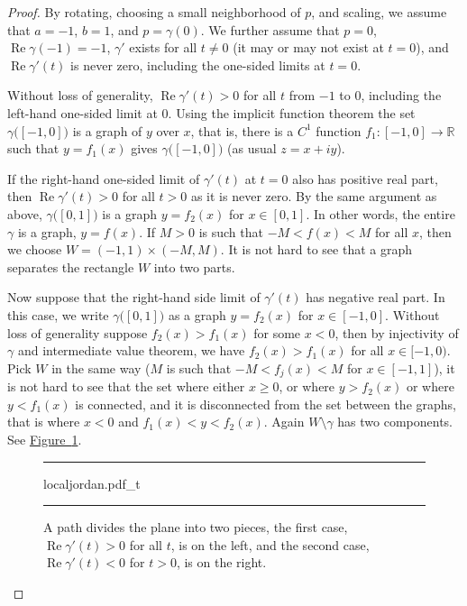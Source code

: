 \documentclass[12pt,openany]{book}
\renewcommand{\Re}{\operatorname{Re}}
\newcommand{\R}{{\mathbb{R}}}
\theoremstyle{plain}
\theoremstyle{remark}
\theoremstyle{definition}
\newenvironment{myfig}{%
\begin{figure}[h!t]
\noindent\rule{\textwidth}{0.5pt}\vspace{12pt}\par\centering}%
{\par\noindent\rule{\textwidth}{0.5pt}
\end{figure}}
\theoremstyle{exercise}
\theoremstyle{example}
\newcommand{\figureref}[1]{\hyperref[#1]{Figure~\ref*{#1}}}
\begin{document}
\begin{proof}
By rotating, choosing a small neighborhood of $p$, and scaling,
we assume that $a=-1$, $b=1$, and $p = \gamma(0)$.
We further assume that
$p=0$, $\Re \gamma(-1) = -1$,
$\gamma'$ exists for all $t \not=0$ (it may or may not exist at $t=0$),
and $\Re \gamma'(t)$ is
never zero, including the one-sided limits at $t=0$.

Without loss of generality, $\Re \gamma'(t) > 0$ for all $t$ from $-1$ to $0$,
including the left-hand one-sided limit at $0$.  Using the implicit function
theorem the set $\gamma\bigl([-1,0]\bigr)$ is a graph of $y$ over $x$, that
is, there is a $C^1$ function $f_1 \colon [-1,0] \to \R$ such that
$y=f_1(x)$ gives $\gamma\bigl([-1,0]\bigr)$ (as usual $z=x+iy$).

If the right-hand one-sided limit of $\gamma'(t)$ at $t=0$ also has positive real
part, then $\Re \gamma'(t) > 0$ for all $t > 0$ as it is never zero.
By the same argument as
above, $\gamma\bigl([0,1]\bigr)$ is a graph $y=f_2(x)$ for $x \in [0,1]$.
In other words, the entire $\gamma$ is a graph, $y=f(x)$.  If $M > 0$ is such that
$-M<f(x)<M$ for all $x$, then
we choose $W=(-1,1) \times (-M,M)$.  It is not hard to see that a
graph separates the rectangle $W$ into two parts.

Now suppose that the right-hand side limit of $\gamma'(t)$ has negative real
part.  In this case, we write $\gamma\bigl([0,1]\bigr)$ as a graph $y=f_2(x)$
for $x \in [-1,0]$.  Without loss of generality suppose $f_2(x) > f_1(x)$
for some $x < 0$, then by injectivity of $\gamma$ and intermediate value
theorem, we have $f_2(x) > f_1(x)$ for all $x \in [-1,0)$.
Pick $W$ in the same way ($M$ is such that $-M < f_j(x) < M$ for $x \in
[-1,1]$), it is not hard to see that the
set where either $x \geq 0$, or where $y > f_2(x)$ or where $y < f_1(x)$
is connected, and it is disconnected from the set between the graphs, that
is where $x < 0$ and $f_1(x) < y < f_2(x)$.  Again $W \setminus \gamma$ has
two components.  See \figureref{fig:localjordan}.
\begin{myfig}
{localjordan.pdf_t}
\caption{A path divides the plane into two pieces, the first case, $\Re
\gamma'(t) > 0$ for all $t$, is on the left, and the second case,
$\Re \gamma'(t) < 0$ for $t > 0$, is on the right.
\label{fig:localjordan}}
\end{myfig}
\end{proof}
\end{document}
